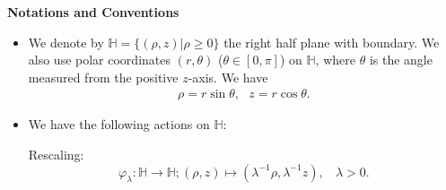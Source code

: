 \documentclass[a4paper,11pt]{amsart}
\theoremstyle{definition}
\numberwithin{equation}{section}
\newcommand{\bH}{\mathbb H}
\begin{document}
 {\bf Notations and Conventions}
 
 \begin{itemize}
 	\item We denote by $\mathbb H=\{(\rho, z)|\rho\geq 0\}$ the right half plane with boundary. We also use polar coordinates $(r, \theta)$ ($\theta\in [0, \pi]$) on $\mathbb H$, where $\theta$ is the angle measured from the positive $z$-axis.  We have 
 \begin{align*}
    \rho = r\sin\theta, \ \ \ 
    z = r\cos\theta.
\end{align*}

\item We have the following actions on $\mathbb H$: 

Rescaling: 
\begin{equation}\label{eqn:dilation}\varphi_\lambda: \bH\rightarrow\bH; (\rho, z)\mapsto (\lambda^{-1}\rho, \lambda^{-1}z), \ \ \ \ \lambda>0.
\end{equation}


\end{itemize}
\end{document}
